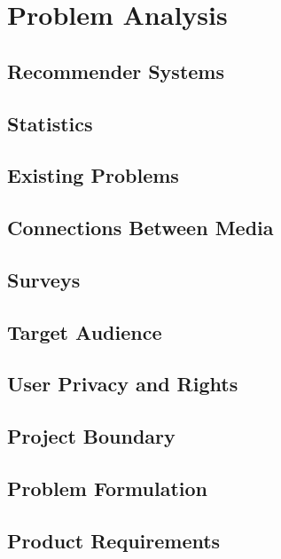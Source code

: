 \chapter{Problem Analysis}

\section{Recommender Systems}
\label{RecommenderSystems}

\section{Statistics}
\label{Statistics}

\section{Existing Problems}
\label{Existing}

\section{Connections Between Media}
\label{Connections}

\section{Surveys}
\label{Surveys}

\section{Target Audience}
\label{TargetAudience}

\section{User Privacy and Rights}
\label{User Rights}

\section{Project Boundary}
\label{Boundary}

\section{Problem Formulation}
\label{Formulation}

\section{Product Requirements}
\label{Requirements}
